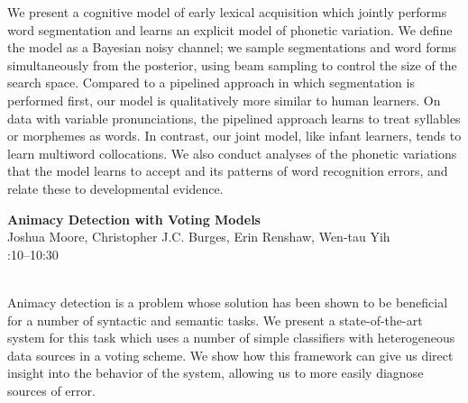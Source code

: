 \documentclass[twoside,makeidx]{book}
\renewcommand{\normalsize}{\fontsize{8}{9}\selectfont}
\renewcommand{\small}{\fontsize{7}{8}\selectfont}
\begin{document}
\nopagebreak%
\noindent%
{\small We present a cognitive model of early lexical acquisition which jointly performs word segmentation and learns an explicit model of phonetic variation. We define the model as a Bayesian noisy channel; we sample segmentations and word forms simultaneously from the posterior, using beam sampling to control the size of the search space. Compared to a pipelined approach in which segmentation is performed first, our model is qualitatively more similar to human learners. On data with variable pronunciations, the pipelined approach learns to treat syllables or morphemes as words. In contrast, our joint model, like infant learners, tends to learn multiword collocations. We also conduct analyses of the phonetic variations that the model learns to accept and its patterns of word recognition errors, and relate these to developmental evidence.}
\par\vspace{2em}\noindent%
\begin{minipage}{\linewidth}%
\begin{center}
\textbf{\normalsize Animacy Detection with Voting Models}\\
\normalsize  Joshua Moore,  Christopher J.C. Burges,  Erin Renshaw,  Wen-tau Yih\\
{\small 10:10--10:30}\\
\end{center}
\end{minipage}\\[0.5em]
\nopagebreak%
\noindent%
{\small Animacy detection is a problem whose solution has been shown to be beneficial for a number of syntactic and semantic tasks. We present a state-of-the-art system for this task which uses a number of simple classifiers with heterogeneous data sources in a voting scheme. We show how this framework can give us direct insight into the behavior of the system, allowing us to more easily diagnose sources of error.}
\clearpage
\end{document}
